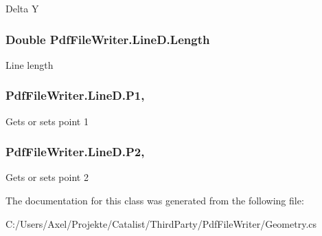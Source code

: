 Delta Y 

\subsubsection[{\texorpdfstring{Length}{Length}}]{\setlength{\rightskip}{0pt plus 5cm}Double Pdf\+File\+Writer.\+Line\+D.\+Length\hspace{0.3cm}{\ttfamily [get]}}\hypertarget{class_pdf_file_writer_1_1_line_d_affec785f565e67003a1776827b59052d}{}\label{class_pdf_file_writer_1_1_line_d_affec785f565e67003a1776827b59052d}


Line length 

\subsubsection[{\texorpdfstring{P1}{P1}}]{ Pdf\+File\+Writer.\+Line\+D.\+P1\hspace{0.3cm}{\ttfamily [get]}, {\ttfamily [set]}}\hypertarget{class_pdf_file_writer_1_1_line_d_ac8339997350c1b6ab278a58c3e45fa77}{}\label{class_pdf_file_writer_1_1_line_d_ac8339997350c1b6ab278a58c3e45fa77}


Gets or sets point 1 

\subsubsection[{\texorpdfstring{P2}{P2}}]{ Pdf\+File\+Writer.\+Line\+D.\+P2\hspace{0.3cm}{\ttfamily [get]}, {\ttfamily [set]}}\hypertarget{class_pdf_file_writer_1_1_line_d_af1c3aaed1d379ac1ac42ec105d2f7e08}{}\label{class_pdf_file_writer_1_1_line_d_af1c3aaed1d379ac1ac42ec105d2f7e08}


Gets or sets point 2 



The documentation for this class was generated from the following file\+:\begin{DoxyCompactItemize}
\item 
C\+:/\+Users/\+Axel/\+Projekte/\+Catalist/\+Third\+Party/\+Pdf\+File\+Writer/Geometry.\+cs\end{DoxyCompactItemize}
